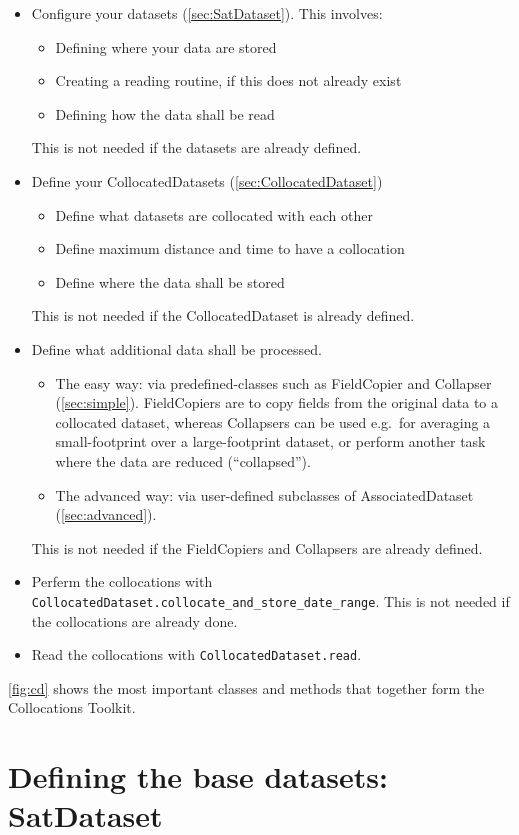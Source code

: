 \documentclass[a4paper,10pt]{article}
\newcommand{\collocs}{Collocations Toolkit}
\begin{document}
\begin{itemize}
\item Configure your datasets (\autoref{sec:SatDataset}).
This involves:
\begin{itemize}
\item Defining where your data are stored
\item Creating a reading routine, if this does not already exist
\item Defining how the data shall be read
\end{itemize}
This is not needed if the datasets are already defined.
\item Define your CollocatedDatasets (\autoref{sec:CollocatedDataset})
\begin{itemize}
\item Define what datasets are collocated with each other
\item Define maximum distance and time to have a collocation
\item Define where the data shall be stored
\end{itemize}
This is not needed if the CollocatedDataset is already defined.
\item Define what additional data shall be processed.
\begin{itemize}
\item The easy way: via predefined-classes such as FieldCopier
and Collapser (\autoref{sec:simple}).
FieldCopiers are to copy fields from the original data to a collocated
dataset, whereas Collapsers can be used e.g.\ for averaging a small-footprint
over a large-footprint dataset, or perform another task where the data are
reduced (``collapsed'').
\item The advanced way: via user-defined subclasses of AssociatedDataset
(\autoref{sec:advanced}).
\end{itemize}
This is not needed if the FieldCopiers and Collapsers are already defined.
\item Perferm the collocations with
\lstinline|CollocatedDataset.collocate_and_store_date_range|. 
This is not needed if the collocations are already done.
\item Read the collocations with \lstinline|CollocatedDataset.read|.
\end{itemize}

\autoref{fig:cd} shows the most important classes and methods that together
form the \collocs.

\section{Defining the base datasets: SatDataset}
\label{sec:SatDataset}
\end{document}
